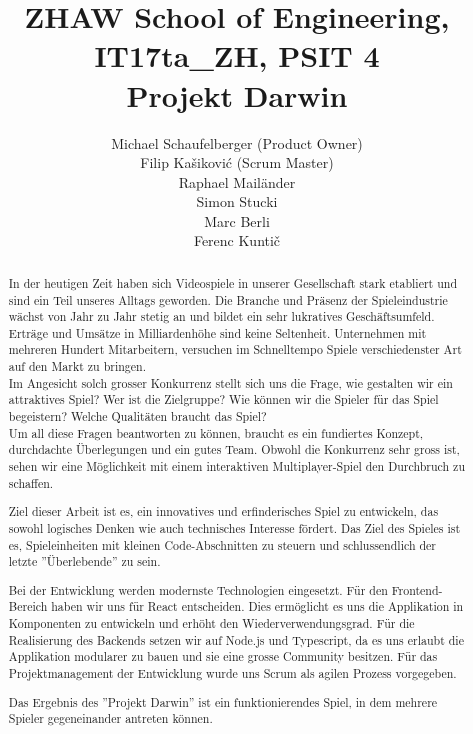 \documentclass[11pt,a4paper,titlepage]{article}
\author{
Michael Schaufelberger (Product Owner)\\
Filip Kašiković (Scrum Master)\\
Raphael Mailänder\\
Simon Stucki\\
Marc Berli\\
Ferenc Kuntič}
\title{{\small ZHAW School of Engineering, 
IT17ta\_ZH, 
PSIT 4}\\
Projekt Darwin}
\begin{document}
\maketitle

\begin{otherlanguage}{english}
\begin{abstract}

In der heutigen Zeit haben sich Videospiele in unserer Gesellschaft stark etabliert und sind ein Teil unseres Alltags geworden. Die Branche und Präsenz der Spieleindustrie wächst von Jahr zu Jahr stetig an und bildet ein sehr lukratives Geschäftsumfeld. Erträge und Umsätze in Milliardenhöhe sind keine Seltenheit. Unternehmen mit mehreren Hundert Mitarbeitern, versuchen im Schnelltempo Spiele verschiedenster Art auf den Markt zu bringen. 
\\Im Angesicht solch grosser Konkurrenz stellt sich uns die Frage, wie gestalten wir ein attraktives Spiel? Wer ist die Zielgruppe? Wie können wir die Spieler für das Spiel begeistern? Welche Qualitäten braucht das Spiel?
\\Um all diese Fragen beantworten zu können, braucht es ein fundiertes Konzept, durchdachte Überlegungen und ein gutes Team. Obwohl die Konkurrenz sehr gross ist, sehen wir eine Möglichkeit mit einem interaktiven Multiplayer-Spiel den Durchbruch zu schaffen.

Ziel dieser Arbeit ist es, ein innovatives und erfinderisches Spiel zu entwickeln, das sowohl logisches Denken wie auch technisches Interesse fördert. Das Ziel des Spieles ist es, Spieleinheiten mit kleinen Code-Abschnitten zu steuern und schlussendlich der letzte ''Überlebende'' zu sein.

Bei der Entwicklung werden modernste Technologien eingesetzt. Für den Frontend-Bereich haben wir uns für React entscheiden. Dies ermöglicht es uns die Applikation in Komponenten zu entwickeln und erhöht den Wiederverwendungsgrad. Für die Realisierung des Backends setzen wir auf Node.js und Typescript, da es uns erlaubt die Applikation modularer zu bauen und sie eine grosse Community besitzen.
Für das Projektmanagement der Entwicklung wurde uns Scrum als agilen Prozess vorgegeben.

Das Ergebnis des ''Projekt Darwin'' ist ein funktionierendes Spiel, in dem mehrere Spieler gegeneinander antreten können.

\end{abstract}
\end{otherlanguage}
\end{document}
